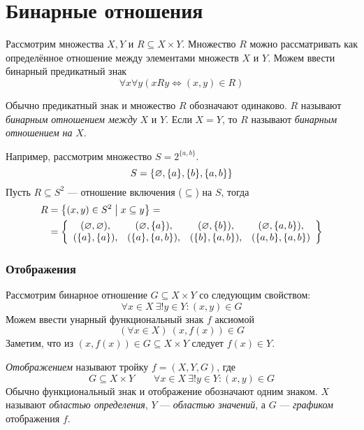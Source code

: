 \part{Бинарные отношения}

Рассмотрим множества $X,Y$ и $R\subseteq X\times Y$. Множество $R$ можно рассматривать
как определённое отношение между элементами множеств $X$ и $Y$. Можем ввести бинарный
предикатный знак
\[
  \forall x\forall y(xRy\iff (x,y)\in R)
\]

Обычно предикатный знак и множество $R$ обозначают одинаково.
$R$ называют {\it бинарным отношением между}
 $X$ и $Y$. Если $X=Y$,
то $R$ называют {\it бинарным отношением на} $X$.

Например, рассмотрим множество $S=2^{\{a,b\}}$.
\[
  S=\{\varnothing,\{a\},\{b\},\{a,b\}\}
\]
Пусть $R\subseteq S^{2}$ --- отношение включения ($\subseteq$) на $S$, тогда
\[
  \begin{aligned}
    R
     & =\left\{(x,y)\in S^{2}\;\big|\; x\subseteq y\right\}= \\
     & =\left\{
    \begin{array}{cccc}
      (\varnothing,\varnothing), & (\varnothing,\{a\}),   & (\varnothing,\{b\}),   & (\varnothing,\{a,b\}),  \\
      (\{a\},\{a\}), & (\{a\},\{a,b\}), & (\{b\},\{a,b\}), & (\{a,b\},\{a,b\})
    \end{array}\right\}
  \end{aligned}
\]

\section{Отображения}

Рассмотрим бинарное отношение $G\subseteq X\times Y$ со следующим свойством:
\[
  \forall x\in X~\exists! y\in Y:(x,y)\in G
\]
Можем ввести унарный функциональный знак $f$ аксиомой
\[
  (\forall x\in X)~(x,f(x))\in G
\]
Заметим, что из $(x,f(x))\in G\subseteq X\times Y$ следует $f(x)\in Y$.

{\it Отображением} называют тройку $f=(X,Y,G)$, где
\[
  G\subseteq X\times Y\qquad
  \forall x\in X~\exists! y\in Y:(x,y)\in G
\]
Обычно функциональный знак и отображение обозначают одним знаком.
$X$ называют {\it областью определения}, $Y$ --- {\it областью значений},
а $G$ --- {\it графиком} отображения $f$.

